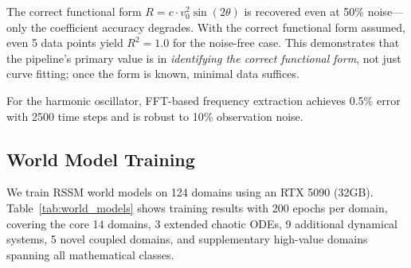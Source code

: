 \documentclass{article}
\begin{document}
The correct functional form $R = c \cdot v_0^2 \sin(2\theta)$ is recovered
even at 50\% noise---only the coefficient accuracy degrades. With the
correct functional form assumed, even 5 data points yield $R^2 = 1.0$ for
the noise-free case. This demonstrates that the pipeline's primary value
is in \emph{identifying the correct functional form}, not just curve
fitting; once the form is known, minimal data suffices.

For the harmonic oscillator, FFT-based frequency extraction achieves
0.5\% error with 2500 time steps and is robust to 10\% observation noise.

\subsection{World Model Training}
\label{sec:world_model_results}

We train RSSM world models on 124 domains using an RTX 5090 (32GB).
Table~\ref{tab:world_models} shows training results with 200 epochs per domain,
covering the core 14 domains, 3 extended chaotic ODEs,
9 additional dynamical systems, 5 novel coupled domains, and
supplementary high-value domains spanning all mathematical classes.
\end{document}
